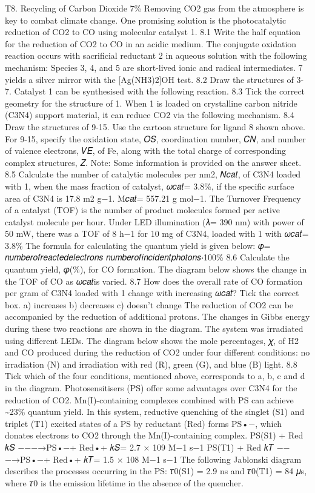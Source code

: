 T8. Recycling of Carbon Dioxide 7\% Removing CO2 gas from the atmosphere is key to combat climate change. One promising solution is the photocatalytic reduction of CO2 to CO using molecular catalyst 1. 8.1 Write the half equation for the reduction of CO2 to CO in an acidic medium. The conjugate oxidation reaction occurs with sacrificial reductant 2 in aqueous solution with the following mechanism: Species 3, 4, and 5 are short-lived ionic and radical intermediates. 7 yields a silver mirror with the [Ag(NH3)2]OH test. 8.2 Draw the structures of 3-7. Catalyst 1 can be synthesised with the following reaction. 8.3 Tick the correct geometry for the structure of 1. When 1 is loaded on crystalline carbon nitride (C3N4) support material, it can reduce CO2 via the following mechanism. 8.4 Draw the structures of 9-15. Use the cartoon structure for ligand 8 shown above. For 9-15, specify the oxidation state, 𝑂𝑆, coordination number, 𝐶𝑁, and number of valence electrons, 𝑉𝐸, of Fe, along with the total charge of corresponding complex structures, 𝑍. Note: Some information is provided on the answer sheet. 8.5 Calculate the number of catalytic molecules per nm2, 𝑁𝑐𝑎𝑡, of C3N4 loaded with 1, when the mass fraction of catalyst, 𝜔𝑐𝑎𝑡= 3.8\%, if the specific surface area of C3N4 is 17.8 m2 g−1. M𝑐𝑎𝑡= 557.21 g mol−1. The Turnover Frequency of a catalyst (TOF) is the number of product molecules formed per active catalyst molecule per hour. Under LED illumination (𝜆= 390 nm) with power of 50 mW, there was a TOF of 8 h−1 for 10 mg of C3N4, loaded with 1 with 𝜔𝑐𝑎𝑡= 3.8\% The formula for calculating the quantum yield is given below: 𝜑= 𝑛𝑢𝑚𝑏𝑒𝑟𝑜𝑓𝑟𝑒𝑎𝑐𝑡𝑒𝑑𝑒𝑙𝑒𝑐𝑡𝑟𝑜𝑛𝑠 𝑛𝑢𝑚𝑏𝑒𝑟𝑜𝑓𝑖𝑛𝑐𝑖𝑑𝑒𝑛𝑡𝑝ℎ𝑜𝑡𝑜𝑛𝑠⋅100\% 8.6 Calculate the quantum yield, 𝜑(\%), for CO formation. The diagram below shows the change in the TOF of CO as 𝜔𝑐𝑎𝑡is varied. 8.7 How does the overall rate of CO formation per gram of C3N4 loaded with 1 change with increasing 𝜔𝑐𝑎𝑡? Tick the correct box. a) increases b) decreases c) doesn't change The reduction of CO2 can be accompanied by the reduction of additional protons. The changes in Gibbs energy during these two reactions are shown in the diagram. The system was irradiated using different LEDs. The diagram below shows the mole percentages, 𝜒, of H2 and CO produced during the reduction of CO2 under four different conditions: no irradiation (N) and irradiation with red (R), green (G), and blue (B) light. 8.8 Tick which of the four conditions, mentioned above, corresponds to a, b, c and d in the diagram. Photosensitisers (PS) offer some advantages over C3N4 for the reduction of CO2. Mn(I)-containing complexes combined with PS can achieve \textasciitilde{}23\% quantum yield. In this system, reductive quenching of the singlet (S1) and triplet (T1) excited states of a PS by reductant (Red) forms PS•−, which donates electrons to CO2 through the Mn(I)-containing complex. PS(S1) + Red 𝑘𝑆 −−−→PS•−+ Red•+ 𝑘𝑆= 2.7 × 109 M−1 s−1 PS(T1) + Red 𝑘𝑇 −−−→PS•−+ Red•+ 𝑘𝑇= 1.5 × 108 M−1 s−1 The following Jablonski diagram describes the processes occurring in the PS: 𝜏0(S1) = 2.9 ns and 𝜏0(T1) = 84 𝜇s, where 𝜏0 is the emission lifetime in the absence of the quencher.

